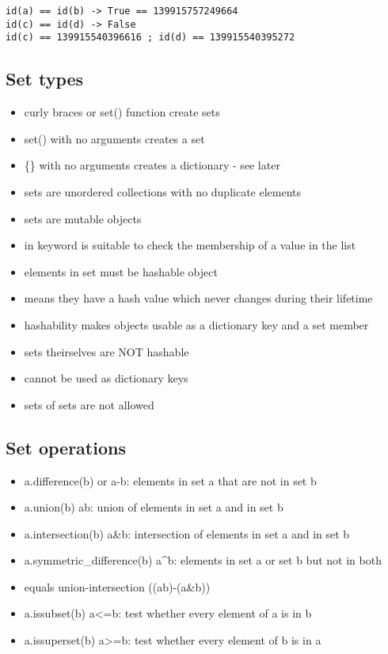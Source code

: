 \documentclass[11pt]{article}
\providecommand{\tightlist}{%
      \setlength{\itemsep}{0pt}\setlength{\parskip}{0pt}}
\begin{document}
    \begin{Verbatim}[commandchars=\\\{\}]
id(a) == id(b) -> True == 139915757249664
id(c) == id(d) -> False
id(c) == 139915540396616 ; id(d) == 139915540395272
    \end{Verbatim}

    \hypertarget{set-types}{%
\subsection{Set types}\label{set-types}}

\begin{itemize}
\tightlist
\item
  curly braces or set() function create sets
\item
  set() with no arguments creates a set
\item
  \{\} with no arguments creates a dictionary - see later
\item
  sets are unordered collections with no duplicate elements
\item
  sets are mutable objects
\item
  in keyword is suitable to check the membership of a value in the list
\item
  elements in set must be hashable object
\item
  means they have a hash value which never changes during their lifetime
\item
  hashability makes objects usable as a dictionary key and a set member
\item
  sets theirselves are NOT hashable
\item
  cannot be used as dictionary keys
\item
  sets of sets are not allowed
\end{itemize}

    \hypertarget{set-operations}{%
\subsection{Set operations}\label{set-operations}}

\begin{itemize}
\tightlist
\item
  a.difference(b) or a-b: elements in set a that are not in set b
\item
  a.union(b) a\textbar b: union of elements in set a and in set b
\item
  a.intersection(b) a\&b: intersection of elements in set a and in set b
\item
  a.symmetric\_difference(b) a\^{}b: elements in set a or set b but not
  in both
\item
  equals union-intersection ((a\textbar b)-(a\&b))
\item
  a.issubset(b) a\textless=b: test whether every element of a is in b
\item
  a.issuperset(b) a\textgreater=b: test whether every element of b is in
  a
\end{itemize}
\end{document}
